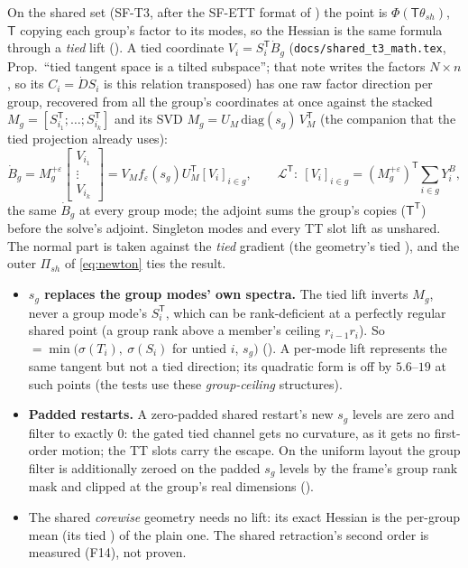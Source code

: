 \documentclass[11pt]{article}
\newcommand{\Lift}{\mathcal{L}}
\newcommand{\T}{\mathsf{T}}
\renewcommand{\th}{\theta}
\newcommand{\eps}{\varepsilon}
\theoremstyle{definition}
\theoremstyle{plain}
\begin{document}
On the shared set (SF-T3, after the SF-ETT format of \cite{MR25}) the point is $\Phi(\mathsf T\th_{sh})$, $\mathsf T$ copying each group's factor to its modes, so
the Hessian is the same formula through a \emph{tied} lift (). A tied coordinate
$V_i=S_i^\T\dot B_g$ (\texttt{docs/shared\_t3\_math.tex}, Prop.\ ``tied tangent space is a tilted subspace'';
that note writes the factors $N\times n$, so its $C_i=\dot DS_i$ is this relation transposed) has one raw
factor direction per group, recovered from all the group's coordinates at once against the stacked
$M_g=[S_{i_1}^\T;\dots;S_{i_k}^\T]$ and its SVD $M_g=U_M\,\mathrm{diag}(s_g)\,V_M^\T$ (the companion
 that the tied projection already uses):
\begin{equation}
  \label{eq:tied}
  \dot B_g=M_g^{+\eps}\begin{bmatrix}V_{i_1}\\ \vdots\\ V_{i_k}\end{bmatrix}
   =V_Mf_\eps(s_g)U_M^\T[V_{i}]_{i\in g},\qquad
  \Lift^\T:\ [V_i]_{i\in g}=(M_g^{+\eps})^\T\textstyle\sum_{i\in g}Y^B_i,
\end{equation}
the same $\dot B_g$ at every group mode; the adjoint sums the group's copies ($\mathsf T^\T$) before the solve's
adjoint. Singleton modes and every TT slot lift as unshared. The normal part is taken against the \emph{tied}
gradient (the geometry's tied ), and the outer $\Pi_{sh}$ of \eqref{eq:newton} ties the result.
\begin{itemize}
\item \textbf{$s_g$ replaces the group modes' own spectra.} The tied lift inverts $M_g$, never a group mode's
  $S_i^\T$, which can be rank-deficient at a perfectly regular shared point (a group rank above a member's ceiling
  $r_{i-1}r_i$). So  $=\min(\sigma(T_i),\ \sigma(S_i)$ for untied $i$, $s_g)$
  (). A per-mode lift represents the same tangent but not a tied direction; its
  quadratic form is off by $5.6$--$19$ at such points (the tests use these \emph{group-ceiling} structures).
\item \textbf{Padded restarts.} A zero-padded shared restart's new $s_g$ levels are zero and filter to exactly 0:
  the gated tied channel gets no curvature, as it gets no first-order motion; the TT slots carry the escape. On the
  uniform layout the group filter is additionally zeroed on the padded $s_g$ levels by the frame's group rank
  mask and clipped at the group's real dimensions ().
\item The shared \emph{corewise} geometry needs no lift: its exact Hessian is the per-group mean (its tied
  ) of the plain one. The shared retraction's second order is measured (F14), not proven.
\end{itemize}
\end{document}
